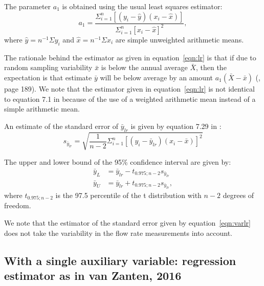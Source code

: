The parameter $a_1$ is obtained using the usual least squares estimator:
\begin{equation}\label{eqn:b}
a_1=\frac{\Sigma_{i=1}^n[(y_i-\hat{y})(x_i-\hat{x})]}{\Sigma_{i=1}^n[x_i-\hat{x}]^2},
\end{equation}
where $\hat{y}=n^{-1}\Sigma y_i$ and $\hat{x}=n^{-1}\Sigma x_i$ are simple unweighted arithmetic means.

The rationale behind the estimator as given in equation~\ref{eqn:lr} is that if due to random sampling variability $\bar{x}$ is below the annual average $\bar{X}$, then the expectation is that estimate $\bar{y}$ will be below average by an amount $a_1(\bar{X}-\bar{x})$ (\cite{Cochran77}, page 189).
We note that the estimator given in equation~\ref{eqn:lr} is not identical to equation 7.1 in \cite{Cochran77} because of the use of a weighted arithmetic mean instead of a simple arithmetic mean.

An estimate of the standard error of $\bar{y}_{lr}$ is given by equation 7.29 in \citet{Cochran77}:
\begin{equation}\label{eqn:varlr}
s_{\bar{y}_{lr}}=\sqrt{ \frac{1}{n-2} \Sigma_{i=1}^{n}[(y_i-\bar{y}_{lr})(x_i-\bar{x})]^2 }
\end{equation}

The upper and lower bound of the 95\% confidence interval are given by:
\begin{subequations}\label{eqn:cilr}
	\begin{align}
	\bar{y}_{L} &= \bar{y}_{lr}-t_{0.975;n-2}s_{\bar{y}_{lr}} \\
	\bar{y}_{U} &= \bar{y}_{lr}+t_{0.975;n-2}s_{\bar{y}_{lr}} ,
	\end{align}
\end{subequations}
where $t_{0.975;n-2}$ is the 97.5 percentile of the t distribution with $n-2$ degrees of freedom.

We note that the estimator of the standard error given by equation~\ref{eqn:varlr} does not take the variability in the flow rate measurements into account. %

\subsection{With a single auxiliary variable: regression estimator as in van Zanten, 2016}\label{AuxVZ}

